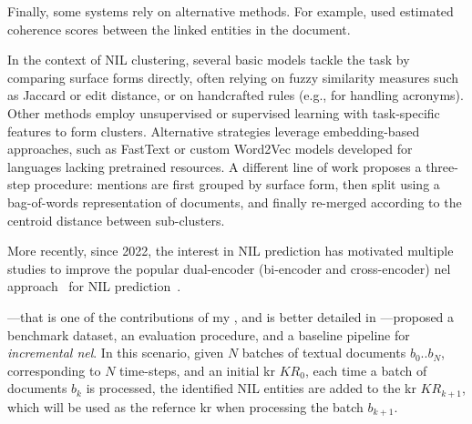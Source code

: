 Finally, some systems rely on alternative methods. For example, \textcite{Paikens-EtAl:2017:TAC-KBP} used estimated coherence scores between the linked entities in the document.

In the context of NIL clustering, several basic models \cite{simone_15,simone_33,simone_73,simone_68,simone_27,simone_67,simone_38,simone_65,simone_63,simone_31} tackle the task by comparing surface forms directly, often relying on fuzzy similarity measures such as Jaccard or edit distance, or on handcrafted rules (e.g., for handling acronyms). Other methods \cite{simone_77,simone_65,simone_33} employ unsupervised or supervised learning with task-specific features to form clusters. Alternative strategies \cite{simone_2} leverage embedding-based approaches, such as FastText \cite{fasttext} or custom Word2Vec models \cite{simone_6} developed for languages lacking pretrained resources. A different line of work \cite{simone_24} proposes a three-step procedure: mentions are first grouped by surface form, then split using a bag-of-words representation of documents, and finally re-merged according to the centroid distance between sub-clusters.




More recently, since 2022, the interest in NIL prediction has motivated multiple studies to improve the popular dual-encoder (bi-encoder and cross-encoder) \ac{nel} approach~\cite{blink} for NIL prediction~\cite{ijckg2022,kassner-etal-2022-edin,aydin-etal-2022-find,Heist2023nastylinker,zhu-etal-2023-learn}.

\textcite{ijckg2022}---that is one of the contributions of my \phd, and is better detailed in ---proposed a benchmark dataset, an evaluation procedure, and a baseline pipeline for \emph{incremental \acl{nel}}. In this scenario, given $N$ batches of textual documents $b_0..b_N$, corresponding to $N$ time-steps, and an initial \ac{kr} $KR_0$, each time a batch of documents $b_k$ is processed, the identified NIL entities are added to the \ac{kr} $KR_{k+1}$, which will be used as the refernce \ac{kr} when processing the batch $b_{k+1}$.

